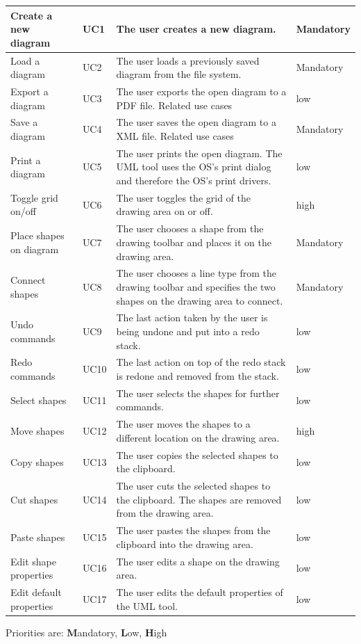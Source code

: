 \documentclass[twoside,letterpaper]{article}
\begin{document}
{\bigskip
\begin{flushleft}
\begin{supertabular}{|m{1.5in}|m{0.6in}|m{3.5in}|m{0.7in}|}
Create a new diagram & UC1 & The user creates a new diagram. & Mandatory
\\\hline
Load a diagram & UC2 & The user loads a previously saved diagram from the file system. & Mandatory
\\\hline
Export a diagram & UC3 & The user exports the open diagram to a PDF file.
Related use cases & low
\\\hline
Save a diagram & UC4 & The user saves the open diagram to a XML file.
Related use cases & Mandatory
\\\hline
Print a diagram & UC5 & The user prints the open diagram. The UML tool uses the OS's  print dialog and therefore the OS's print drivers. & low
\\\hline
Toggle grid on/off & UC6 & The user toggles the grid of the drawing area on or off. & high
\\\hline
Place shapes on diagram & UC7 & The user chooses a shape from the drawing toolbar and places it on the drawing area. & Mandatory
\\\hline
Connect shapes & UC8 & The user chooses a line type from the drawing toolbar and specifies the two shapes on the drawing area to connect. & Mandatory
\\\hline
Undo commands & UC9 & The last action taken by the user is being undone and put into a redo stack. & low
\\\hline
Redo commands & UC10 & The last action on top of the redo stack is redone and removed from the stack. & low
\\\hline
Select shapes & UC11 & The user selects the shapes for further commands. & low
\\\hline
Move shapes & UC12 & The user moves the shapes to a different location on the drawing area. & high
\\\hline
Copy shapes & UC13 & The user copies the selected shapes to the clipboard. & low
\\\hline
Cut shapes & UC14 & The user cuts the selected shapes to the clipboard. The shapes are removed from the drawing area. & low
\\\hline
Paste shapes & UC15 & The user pastes the shapes from the clipboard into the drawing area. & low
\\\hline
Edit shape properties & UC16 & The user edits a shape on the drawing area. & low
\\\hline
Edit default properties & UC17 & The user edits the default properties of the UML tool. & low
\\\hline
\end{supertabular}
\end{flushleft}
{\color{black}
Priorities are: \textbf{M}andatory, \textbf{L}ow, \textbf{H}igh}

}
\end{document}
